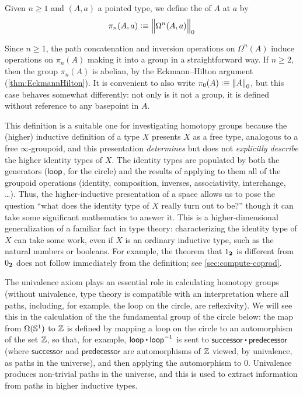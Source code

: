 \begin{defn}\label{def-of-homotopy-groups}
  Given $n\ge 1$ and $(A,a)$ a pointed type, we define the  of $A$
  at $a$ by
  \[\pi_n(A,a)\defeq \Trunc0{\Omega^n(A,a)}\]
\end{defn}

\noindent
Since $n\ge 1$, the path concatenation and inversion operations on
$\Omega^n(A)$ induce operations on $\pi_n(A)$ making it into a group in
a straightforward way.  If $n\ge 2$, then the group $\pi_n(A)$ is
abelian, by the Eckmann--Hilton argument  (\autoref{thm:EckmannHilton}).
It is convenient to also write $\pi_0(A) \defeq \trunc0 A$,
but this case behaves somewhat differently: not only is it not a group,
it is defined without reference to any basepoint in $A$.

%
This definition is a suitable one for investigating homotopy groups
because the (higher) inductive definition of a type $X$ presents $X$ as
a free type, analogous to a free $\infty$-groupoid,
%
and this
presentation \emph{determines} but does not \emph{explicitly describe}
the higher identity types of $X$.  The identity types are populated by
both the generators ($\lloop$, for the circle) and the results of applying to them all of the groupoid
operations (identity, composition, inverses, associativity, interchange,
\ldots).  Thus, the higher-inductive presentation of a space allows us
to pose the question ``what does the identity type of $X$ really turn out
to be?'' though it can take some significant mathematics to answer it.
This is a higher-dimensional generalization of a familiar fact in type
theory: characterizing the identity type of $X$ can take some work,
even if $X$ is an ordinary inductive type, such as the natural numbers
or booleans.  For example, the theorem that $\btrue$ is different
from $\bfalse$ does not follow immediately from the definition;
see \autoref{sec:compute-coprod}.

%
The univalence axiom plays an essential role in calculating homotopy
groups (without univalence, type theory is compatible with an
interpretation where all paths, including, for example, the loop on the
circle, are reflexivity).  We will see this in the calculation of the
the fundamental group of the circle below: the map from $\Omega(\Sn^1)$ to $\Z$ is defined by mapping a loop on the circle to an
automorphism of the set $\Z$, so that, for example, $\lloop \ct \opp
\lloop$ is sent to $\mathsf{successor} \ct \mathsf{predecessor}$ (where
$\mathsf{successor}$ and $\mathsf{predecessor}$ are automorphisms of
$\Z$ viewed, by univalence, as paths in the universe), and then applying
the automorphism to 0. Univalence produces non-trivial paths in the
universe, and this is used to extract information from paths in higher
inductive types.

